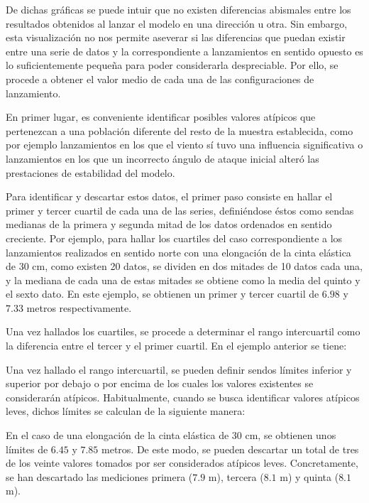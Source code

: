 De dichas gráficas se puede intuir que no existen diferencias abismales entre los resultados obtenidos al lanzar el modelo en una dirección u otra. Sin embargo, esta visualización no nos permite aseverar si las diferencias que puedan existir entre una serie de datos y la correspondiente a lanzamientos en sentido opuesto es lo suficientemente pequeña para poder considerarla despreciable. Por ello, se procede a obtener el valor medio de cada una de las configuraciones de lanzamiento.

En primer lugar, es conveniente identificar posibles valores atípicos que pertenezcan a una población diferente del resto de la muestra establecida, como por ejemplo lanzamientos en los que el viento sí tuvo una influencia significativa o lanzamientos en los que un incorrecto ángulo de ataque inicial alteró las prestaciones de estabilidad del modelo.

Para identificar y descartar estos datos, el primer paso consiste en hallar el primer y tercer cuartil de cada una de las series, definiéndose éstos como sendas medianas de la primera y segunda mitad de los datos ordenados en sentido creciente. Por ejemplo, para hallar los cuartiles del caso correspondiente a los lanzamientos realizados en sentido norte con una elongación de la cinta elástica de 30 cm, como existen 20 datos, se dividen en dos mitades de 10 datos cada una, y la mediana de cada una de estas mitades se obtiene como la media del quinto y el sexto dato. En este ejemplo, se obtienen un primer y tercer cuartil de $6.98$ y $7.33$ metros respectivamente.

Una vez hallados los cuartiles, se procede a determinar el rango intercuartil como la diferencia entre el tercer y el primer cuartil. En el ejemplo anterior se tiene:

Una vez hallado el rango intercuartil, se pueden definir sendos límites inferior y superior por debajo o por encima de los cuales los valores existentes se considerarán atípicos. Habitualmente, cuando se busca identificar valores atípicos leves, dichos límites se calculan de la siguiente manera:

En el caso de una elongación de la cinta elástica de 30 cm, se obtienen unos límites de $6.45$ y $7.85$ metros. De este modo, se pueden descartar un total de tres de los veinte valores tomados por ser considerados atípicos leves. Concretamente, se han descartado las mediciones primera ($7.9$ m), tercera ($8.1$ m) y quinta ($8.1$ m).

